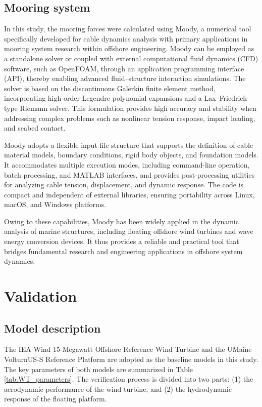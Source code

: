 \documentclass[%
 aip,
 amsmath,amssymb,
 reprint,%
]{revtex4-1}
\begin{document}
\subsection{Mooring system}

In this study, the mooring forces were calculated using Moody, a numerical tool specifically developed for cable dynamics analysis with primary applications in mooring system research within offshore engineering. Moody can be employed as a standalone solver or coupled with external computational fluid dynamics (CFD) software, such as OpenFOAM, through an application programming interface (API), thereby enabling advanced fluid–structure interaction simulations. The solver is based on the discontinuous Galerkin finite element method, incorporating high-order Legendre polynomial expansions and a Lax–Friedrich-type Riemann solver. This formulation provides high accuracy and stability when addressing complex problems such as nonlinear tension response, impact loading, and seabed contact.

Moody adopts a flexible input file structure that supports the definition of cable material models, boundary conditions, rigid body objects, and foundation models. It accommodates multiple execution modes, including command-line operation, batch processing, and MATLAB interfaces, and provides post-processing utilities for analyzing cable tension, displacement, and dynamic response. The code is compact and independent of external libraries, ensuring portability across Linux, macOS, and Windows platforms.

Owing to these capabilities, Moody has been widely applied in the dynamic analysis of marine structures, including floating offshore wind turbines and wave energy conversion devices. It thus provides a reliable and practical tool that bridges fundamental research and engineering applications in offshore system dynamics.

\section{Validation}  

\subsection{Model description}  

The IEA Wind 15-Megawatt Offshore Reference Wind Turbine\citet{gaertner2020definition} and the UMaine VolturnUS-S Reference Platform\citet{allen2020definition} are adopted as the baseline models in this study. The key parameters of both models are summarized in Table \ref{tab:WT_parameters}. The verification process is divided into two parts: (1) the aerodynamic performance of the wind turbine, and (2) the hydrodynamic response of the floating platform.
\end{document}
